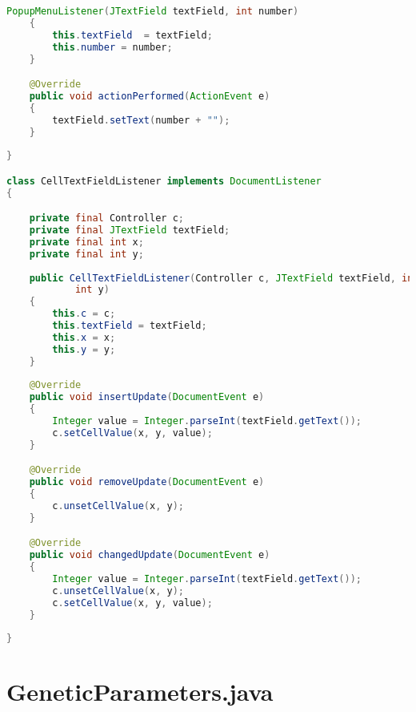 \begin{lstlisting}[language=Java,basicstyle=\tiny,caption=GUI.java]
    PopupMenuListener(JTextField textField, int number)
    {
        this.textField  = textField;
        this.number = number; 
    }

    @Override
    public void actionPerformed(ActionEvent e)
    {
        textField.setText(number + "");
    }
    
}

class CellTextFieldListener implements DocumentListener
{

    private final Controller c;
    private final JTextField textField;
    private final int x;
    private final int y;
    
    public CellTextFieldListener(Controller c, JTextField textField, int x, 
            int y)
    {
        this.c = c;
        this.textField = textField;
        this.x = x;
        this.y = y;
    }
    
    @Override
    public void insertUpdate(DocumentEvent e)
    {
        Integer value = Integer.parseInt(textField.getText());
        c.setCellValue(x, y, value);
    }

    @Override
    public void removeUpdate(DocumentEvent e)
    {
        c.unsetCellValue(x, y);
    }

    @Override
    public void changedUpdate(DocumentEvent e)
    {
        Integer value = Integer.parseInt(textField.getText());
        c.unsetCellValue(x, y);
        c.setCellValue(x, y, value);
    }
    
}
\end{lstlisting}

\section{GeneticParameters.java}
\label{sec:kodeprogramgeneticparameters}

